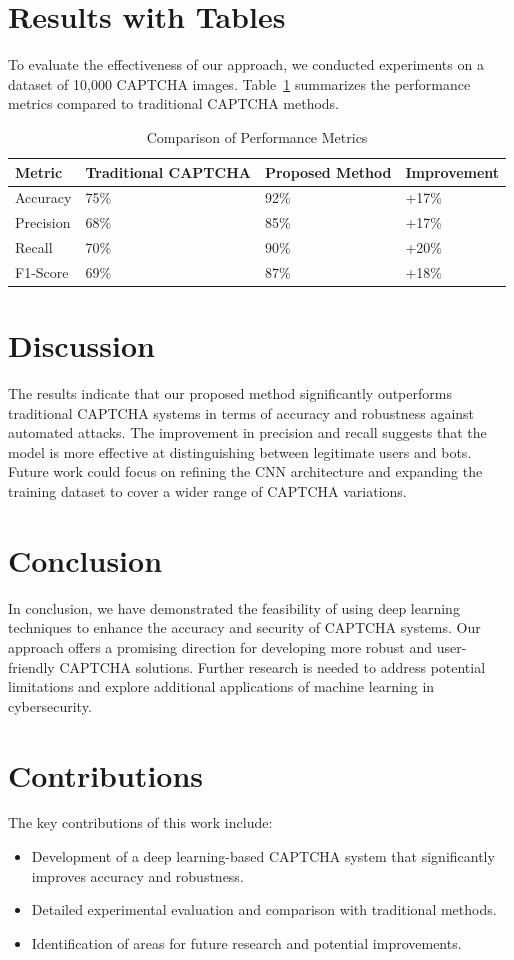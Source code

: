 \documentclass{article}
\begin{document}
\section{Results with Tables}
To evaluate the effectiveness of our approach, we conducted experiments on a dataset of 10,000 CAPTCHA images. Table~\ref{tab:results} summarizes the performance metrics compared to traditional CAPTCHA methods.

\begin{table}[ht]
\centering
\caption{Comparison of Performance Metrics}
\label{tab:results}
\begin{tabular}{@{}llll@{}}
\toprule
Metric & Traditional CAPTCHA & Proposed Method & Improvement \\ \midrule
Accuracy & 75\% & 92\% & +17\% \\
Precision & 68\% & 85\% & +17\% \\
Recall & 70\% & 90\% & +20\% \\
F1-Score & 69\% & 87\% & +18\% \\ \bottomrule
\end{tabular}
\end{table}

\section{Discussion}
The results indicate that our proposed method significantly outperforms traditional CAPTCHA systems in terms of accuracy and robustness against automated attacks. The improvement in precision and recall suggests that the model is more effective at distinguishing between legitimate users and bots. Future work could focus on refining the CNN architecture and expanding the training dataset to cover a wider range of CAPTCHA variations.

\section{Conclusion}
In conclusion, we have demonstrated the feasibility of using deep learning techniques to enhance the accuracy and security of CAPTCHA systems. Our approach offers a promising direction for developing more robust and user-friendly CAPTCHA solutions. Further research is needed to address potential limitations and explore additional applications of machine learning in cybersecurity.

\section{Contributions}
The key contributions of this work include:
\begin{itemize}
    \item Development of a deep learning-based CAPTCHA system that significantly improves accuracy and robustness.
    \item Detailed experimental evaluation and comparison with traditional methods.
    \item Identification of areas for future research and potential improvements.
\end{itemize}

\end{document}
